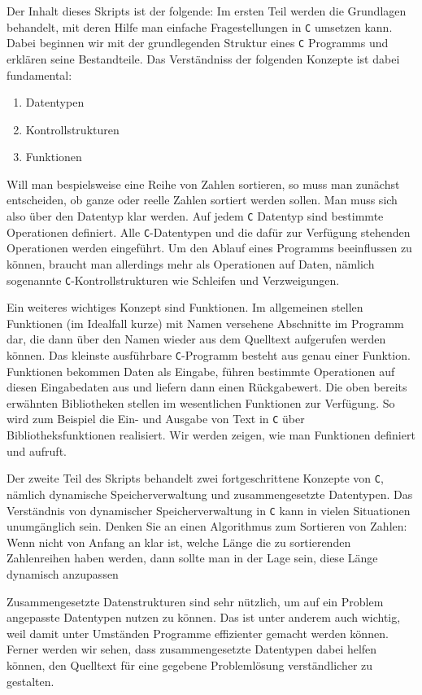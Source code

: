 Der Inhalt dieses Skripts ist der folgende: Im ersten Teil werden die Grundlagen behandelt, mit deren Hilfe man einfache Fragestellungen in \texttt{C} umsetzen kann.
Dabei beginnen wir mit der grundlegenden Struktur eines \texttt{C} Programms und erklären seine Bestandteile.
Das Verständniss der folgenden Konzepte ist dabei fundamental:
\begin{enumerate}
\item Datentypen
\item Kontrollstrukturen
\item Funktionen
\end{enumerate}
Will man bespielsweise eine Reihe von Zahlen sortieren, so muss man zunächst entscheiden, ob ganze oder reelle Zahlen sortiert werden sollen.
Man muss sich also über den Datentyp klar werden.
Auf jedem \texttt{C} Datentyp sind bestimmte Operationen definiert.
Alle \texttt{C}-Datentypen und die dafür zur Verfügung stehenden Operationen werden eingeführt.
Um den Ablauf eines Programms beeinflussen zu können, braucht man allerdings mehr als Operationen auf Daten, nämlich sogenannte \texttt{C}-Kontrollstrukturen wie Schleifen und Verzweigungen.

Ein weiteres wichtiges Konzept sind Funktionen.
Im allgemeinen stellen Funktionen (im Idealfall kurze) mit Namen versehene Abschnitte im Programm dar, die dann über den Namen wieder aus dem Quelltext aufgerufen werden können.
Das kleinste ausführbare \texttt{C}-Programm besteht aus genau einer Funktion.
Funktionen bekommen Daten als Eingabe, führen bestimmte Operationen auf diesen Eingabedaten aus und liefern dann einen Rückgabewert.
Die oben bereits erwähnten Bibliotheken stellen im wesentlichen Funktionen zur Verfügung.
So wird zum Beispiel die Ein- und Ausgabe von Text in \texttt{C} über Bibliotheksfunktionen realisiert.
Wir werden zeigen, wie man Funktionen definiert und aufruft.

Der zweite Teil des Skripts behandelt zwei fortgeschrittene Konzepte von \texttt{C}, nämlich dynamische Speicherverwaltung und zusammengesetzte Datentypen.
Das Verständnis von dynamischer Speicherverwaltung in \texttt{C} kann in vielen Situationen unumgänglich sein.
Denken Sie an einen Algorithmus zum Sortieren von Zahlen: Wenn nicht von Anfang an klar ist, welche Länge die zu sortierenden Zahlenreihen haben werden, dann sollte man in der Lage sein, diese Länge dynamisch anzupassen

Zusammengesetzte Datenstrukturen sind sehr nützlich, um auf ein Problem angepasste Datentypen nutzen zu können.
Das ist unter anderem auch wichtig, weil damit unter Umständen Programme effizienter gemacht werden können.
Ferner werden wir sehen, dass zusammengesetzte Datentypen dabei helfen können, den Quelltext für eine gegebene Problemlösung verständlicher zu gestalten.

